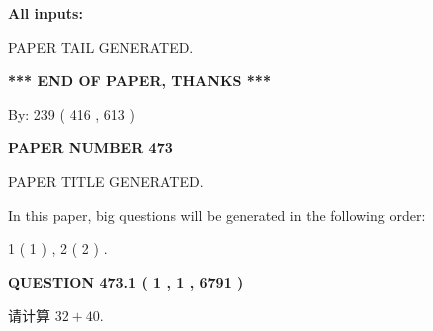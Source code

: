 \documentclass{ctexart}
\begin{document}
   
   
   
\noindent\vspace{0.1in}\hspace{-0.08in} {\textbf{\Large{All inputs: }}}
   
   
   
   
   
   
 \vspace{0.2in}
 
   
   
\vspace{2.0in} PAPER TAIL GENERATED.
   
   
   
   
\vspace{1.0in} 
{\textbf{\large{ *** END OF PAPER, THANKS *** }}} 
   
   
\hspace{1.0in} By: 
 239 ( 416 ,  613 )
   
   
   
   
\newpage 
\setcounter{page}{ 
   473001 } 
   
   
   
   
 {\textbf{ \Large{ PAPER NUMBER  473  }}}
   
   
\vspace{0.2in}
   
   
   
   
   
   
   
   
 \vspace{0.2in}
 
 
 
 
   
   
 PAPER TITLE GENERATED.
   
   
   
\vspace{0.2in}
   
In this paper, big questions will be generated in the following order: 
   
   
   1 ( 1 )
 ,
   2 ( 2 )
 .
  
\vspace{0.2in}
  
{\textbf{\Large{QUESTION
473.1 
 ( 1 , 1 , 6791 )
}}}
  
  
 
请计算 $ %
32 +  %
40 $.
 
 
 
\noindent{}
 
\end{document}
